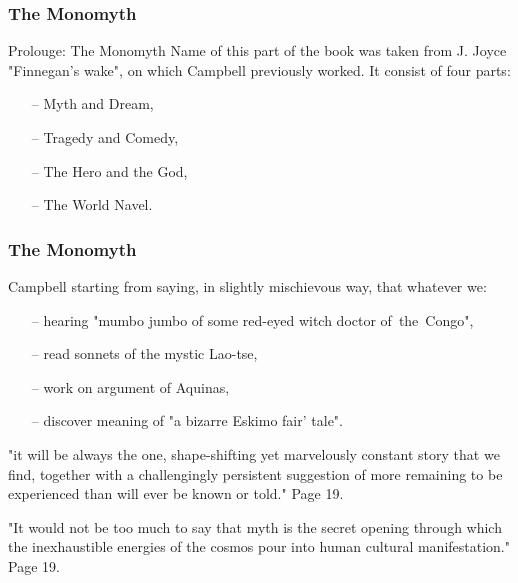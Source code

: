 \documentclass[10pt,t]{beamer}
\begin{document}
\begin{frame}
  \frametitle{The Monomyth}

  \begin{block}{Prolouge: The Monomyth}
    Name of this part of the book was taken from J. Joyce "Finnegan's
    wake", on which Campbell previously worked. It consist of four
    parts:
    \begin{itemize}
    \item[--] Myth and Dream,
    \item[--] Tragedy and Comedy,
    \item[--] The Hero and the God,
    \item[--] The World Navel.
    \end{itemize}
  \end{block}

\end{frame}



\begin{frame}
  \frametitle{The Monomyth}

  \begin{block}{}
    Campbell starting from saying, in slightly mischievous way, that
    whatever we:
    \begin{itemize}
    \item[--] hearing "mumbo jumbo of some red-eyed witch doctor
      of~the~Congo",
    \item[--] read sonnets of the mystic Lao-tse,
    \item[--] work on argument of Aquinas,
    \item[--] discover meaning of "a bizarre Eskimo fair' tale".
    \end{itemize}
    "it will be always the one, shape-shifting yet marvelously
    constant story that we find, together with a challengingly
    persistent suggestion of more remaining to be experienced than
    will ever be known or told." Page 19.
  \end{block}
  \pause

  \begin{block}{}
    "It would not be too much to say that myth is the secret opening
    through which the inexhaustible energies of the cosmos pour into
    human cultural manifestation." Page 19.
  \end{block}

\end{frame}
\end{document}
